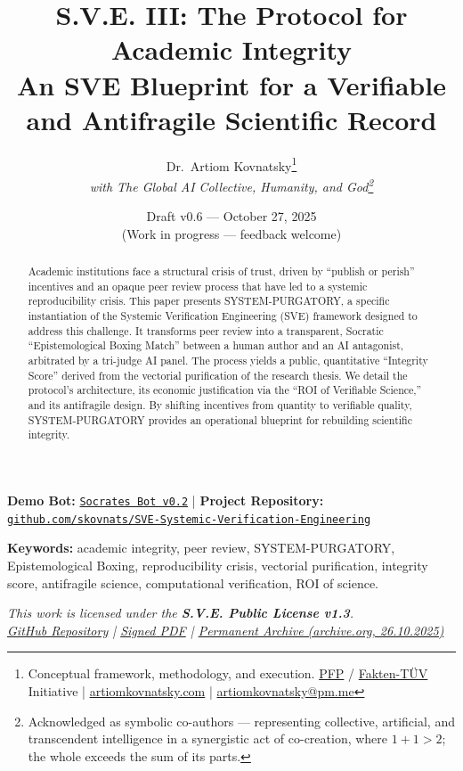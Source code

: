 \documentclass[11pt,a4paper]{article}
\title{\textbf{S.V.E. III: The Protocol for Academic Integrity}\\[0.5em]
\large An SVE Blueprint for a Verifiable and Antifragile Scientific Record}
\author{
  Dr.\ Artiom Kovnatsky\thanks{Conceptual framework, methodology, and execution. 
  \href{http://www.pfp24.de}{PFP} / 
  \href{http://www.fakten-tuev.de}{Fakten-TÜV} Initiative \;|\;
  \href{https://www.artiomkovnatsky.com/}{artiomkovnatsky.com} \;|\;
  \href{mailto:artiomkovnatsky@pm.me}{artiomkovnatsky@pm.me}}\\
  \textit{with The Global AI Collective, Humanity, and God\footnote{Acknowledged as symbolic co-authors — representing collective, artificial, and transcendent intelligence in a synergistic act of co-creation, where $1 + 1 > 2$; the whole exceeds the sum of its parts.}}
}
\date{Draft v0.6 — October 27, 2025\\
\small (Work in progress — feedback welcome)}
\begin{document}
\maketitle
\vspace{-1em}
\begin{center}
    {\small 
    \textbf{Demo Bot:} 
    \href{https://chatgpt.com/g/g-68f1fc9848948191a1cc038db8e3422b-sokrat-socrates-bot-v0-2}
    {\texttt{Socrates Bot v0.2}} 
    \quad|\quad
    \textbf{Project Repository:} 
    \href{https://codeberg.org/skovnats/SVE-Systemic-Verification-Engineering}
    {\texttt{github.com/skovnats/SVE-Systemic-Verification-Engineering}}}
\end{center}
\vspace{1em}
\thispagestyle{empty}


\begin{abstract}
\noindent Academic institutions face a structural crisis of trust, driven by ``publish or perish'' incentives and an opaque peer review process that have led to a systemic reproducibility crisis. This paper presents SYSTEM-PURGATORY, a specific instantiation of the Systemic Verification Engineering (SVE) framework designed to address this challenge. It transforms peer review into a transparent, Socratic ``Epistemological Boxing Match'' between a human author and an AI antagonist, arbitrated by a tri-judge AI panel. The process yields a public, quantitative ``Integrity Score'' derived from the vectorial purification of the research thesis. We detail the protocol's architecture, its economic justification via the ``ROI of Verifiable Science,'' and its antifragile design. By shifting incentives from quantity to verifiable quality, SYSTEM-PURGATORY provides an operational blueprint for rebuilding scientific integrity.
\end{abstract}

\noindent\textbf{Keywords:} academic integrity, peer review, SYSTEM-PURGATORY, Epistemological Boxing, reproducibility crisis, vectorial purification, integrity score, antifragile science, computational verification, ROI of science.

\vspace{1em}
\begin{center}
\begin{minipage}{0.85\textwidth}
\centering
\itshape\small
This work is licensed under the \textbf{S.V.E. Public License v1.3}.\\[0.3em]
\href{https://codeberg.org/skovnats/SVE-Systemic-Verification-Engineering/tree/master/License/signed}{GitHub Repository}
\quad|\quad
\href{https://codeberg.org/skovnats/SVE-Systemic-Verification-Engineering/src/branch/master/License/signed/_SVE-Systemic-Verification-Engineering_License_SIGNED.pdf}{Signed PDF}
\quad|\quad
\href{https://archive.org/details/sve_public_license_v1.3}{Permanent Archive (archive.org, 26.10.2025)}
\end{minipage}
\end{center}
\vspace{1em}
\end{document}
